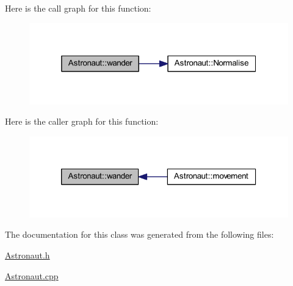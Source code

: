 Here is the call graph for this function\+:
\nopagebreak
\begin{figure}[H]
\begin{center}
\leavevmode
\includegraphics[width=319pt]{class_astronaut_a39d7e43f8604bf561570e2eb2564a8fa_cgraph}
\end{center}
\end{figure}
Here is the caller graph for this function\+:
\nopagebreak
\begin{figure}[H]
\begin{center}
\leavevmode
\includegraphics[width=320pt]{class_astronaut_a39d7e43f8604bf561570e2eb2564a8fa_icgraph}
\end{center}
\end{figure}


The documentation for this class was generated from the following files\+:\begin{DoxyCompactItemize}
\item 
\hyperlink{_astronaut_8h}{Astronaut.\+h}\item 
\hyperlink{_astronaut_8cpp}{Astronaut.\+cpp}\end{DoxyCompactItemize}
